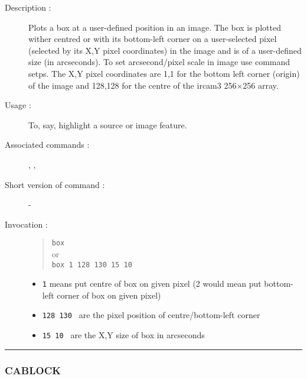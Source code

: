 \begin{description}

\item[Description :] Plots a box at a user-defined position in an image.
The box is plotted wither centred or with its bottom-left corner on a
user-selected pixel (selected by its X,Y pixel coordinates) in the image
and is of a user-defined size (in arcseconds).  To set arcsecond/pixel
scale in image use command setps.  The X,Y pixel coordinates are 1,1 for
the bottom left corner (origin) of the image and 128,128 for the centre of
the {\sc ircam3} 256$\times$256 array.

\item[Usage :] To, say, highlight a source or image feature.
\item[Associated commands :] {\tt {}},
{\tt {}}, {\tt {}}
\item[Short version of command :] -
\item[Invocation :]

\begin{quote}{\tt  box }\\
or \\
{\tt box 1 128 130 15 10 }
\end{quote}

\begin{itemize}

\item {\tt 1} means put centre of box on given pixel
(2 would mean put bottom-left corner of box on given pixel)
\item {\tt 128 130 } are the pixel position of centre/bottom-left corner
\item {\tt 15 10 } are the X,Y size of box in arcseconds
\end{itemize}
\end{description}

\hrule
\subsubsection*{\label{CABLOCK}CABLOCK}

